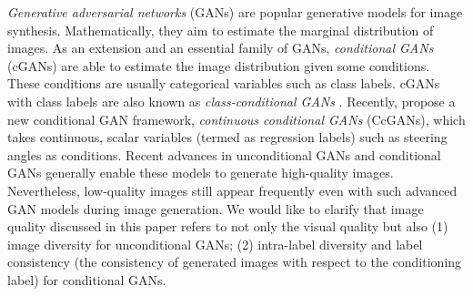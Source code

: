 \documentclass[10pt, twocolumn]{article}
\theoremstyle{definition}
\begin{document}
\textit{Generative adversarial networks} (GANs) \cite{goodfellow2014generative} are popular generative models for image synthesis. Mathematically, they aim to estimate the marginal distribution of images. As an extension and an essential family of GANs, \textit{conditional GANs} (cGANs) \cite{mirza2014conditional} are able to estimate the image distribution given some conditions. These conditions are usually categorical variables such as class labels. cGANs with class labels are also known as \textit{class-conditional GANs} \cite{odena2017conditional, miyato2018cgans, brock2018large, zhang2019self}. Recently, \cite{ding2021ccgan, ding2020continuous} propose a new conditional GAN framework, \textit{continuous conditional GANs} (CcGANs), which takes continuous, scalar variables (termed as regression labels) such as steering angles as conditions. Recent advances in unconditional GANs \cite{karras2019style, karras2020analyzing} and conditional GANs \cite{brock2018large, ding2021ccgan, ding2020continuous} generally enable these models to generate high-quality images. Nevertheless, low-quality images still appear frequently even with such advanced GAN models during image generation. We would like to clarify that image quality discussed in this paper refers to not only the visual quality but also (1) image diversity for unconditional GANs; (2) intra-label diversity and label consistency (the consistency of generated images with respect to the conditioning label) \cite{ding2021ccgan, devries2019evaluation} for conditional GANs. 
\end{document}
